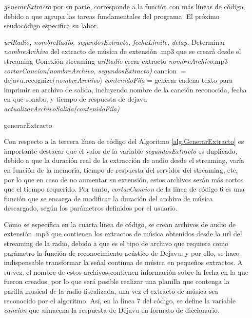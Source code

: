 \textit{generarExtracto} por su parte, corresponde a la función con más líneas de código, debido a que agrupa las tareas fundamentales del programa. El próximo seudocódigo especifica su labor.

\begin{algorithm}
\begin{algorithmic}[1]
\REQUIRE \textit{urlRadio, nombreRadio, segundosExtracto, fechaLimite, delay.}
\STATE Determinar \textit{nombreArchivo} del extracto de música de extensión .mp3 que se creará desde el streaming
\STATE Conexión streaming \textit{urlRadio}
\STATE crear extracto \textit{nombreArchivo}.mp3
\ENDWHILE 
\STATE \textit{cortarCancion(nombreArchivo, segundosExtracto)}
\STATE cancion $=$ dejavu.recognize(\textit{nombreArchivo})
\STATE \textit{contenidoFila} = generar cadena texto para imprimir en archivo de salida, incluyendo nombre de la canción reconocida, fecha en que sonaba, y tiempo de respuesta de dejavu
\STATE \textit{actualizarArchivoSalida(contenidoFila)}

\end{algorithmic}
\caption{generarExtracto}\label{alg:GenerarExtracto}
\end{algorithm}



Con respecto a la tercera línea de código del Algoritmo \ref{alg:GenerarExtracto} es importante destacar que el valor de la variable \textit{segundosExtracto} es duplicado, debido a que la duración real de la extracción de audio desde el streaming, varía en función de la memoria, tiempo de respuesta del servidor del streaming, etc, por lo que en caso de no aumentar su extensión, estos archivos serán más cortos que el tiempo requerido. Por tanto, \textit{cortarCancion} de la línea de código 6 es una función que se encarga de modificar la duración del archivo de música descargado, según los parámetros definidos por el usuario.

Como se especifica en la cuarta línea de código, se crean archivos de audio de extensión .mp3 que contienen los extractos de música obtenidos desde la url del streaming de la radio, debido a que es el tipo de archivo que requiere como parámetro la función de reconocimiento acústico de Dejavu, y por ello, se hace indispensable transformar la señal continua de música en pequeños extractos. A su vez, el nombre de estos archivos contienen información sobre la fecha en la que fueron creados, por lo que será posible realizar una planilla que contenga la parilla musical de la radio fiscalizada, una vez el extracto de música sea reconocido por el algoritmo. Así, en la línea 7 del código, se define la variable \textit{cancion} que almacena la respuesta de Dejavu en formato de diccionario. 

